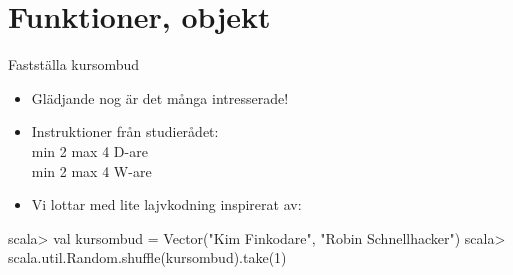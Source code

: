 \documentclass{lecturenotes}
\renewcommand{\vecka}{3}
\newcommand{\veckotema}{Funktioner, objekt}
\begin{document}
\frame{\titlepage}
\setnextsection{\vecka}
\section[Vecka \vecka: \veckotema]{\veckotema}
\frame{\tableofcontents}

\ifkompendium\else

\begin{Slide}{Fastställa kursombud}
\begin{itemize}
\item Glädjande nog är det många intresserade!
\item Instruktioner från studierådet: \\ min 2 max 4 D-are \\ min 2 max 4 W-are
\item Vi lottar med lite lajvkodning inspirerat av:
\end{itemize}
\begin{REPL}
scala> val kursombud = Vector("Kim Finkodare", "Robin Schnellhacker")
scala> scala.util.Random.shuffle(kursombud).take(1)
\end{REPL} 
\end{Slide}



\fi
\end{document}
